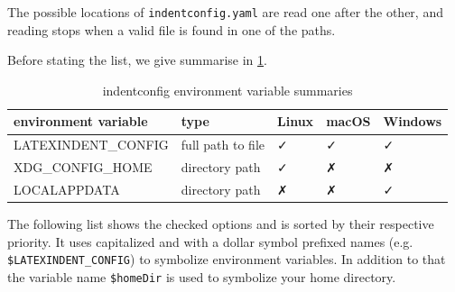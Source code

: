   The possible locations of \texttt{indentconfig.yaml} are read one after the other, and
  reading stops when a valid file is found in one of the paths.

  Before stating the list, we give summarise in \cref{tab:environment:summary}.
  \begin{table}[!htb]
   \centering
   \caption{indentconfig environment variable summaries}
   \label{tab:environment:summary}
   \begin{tabular}{lllll}
    \toprule
    environment variable & type              & Linux    & macOS    & Windows  \\
    \midrule
    LATEXINDENT\_CONFIG  & full path to file & \faCheck & \faCheck & \faCheck \\
    XDG\_CONFIG\_HOME    & directory path    & \faCheck & \faClose & \faClose \\
    LOCALAPPDATA         & directory path    & \faClose & \faClose & \faCheck \\
    \bottomrule
   \end{tabular}
  \end{table}

  The following list shows the checked options and is sorted by their respective
  priority. It uses capitalized and with a dollar symbol prefixed names (e.g.
  \texttt{\$LATEXINDENT\_CONFIG}) to symbolize environment variables. In addition to that
  the variable name \texttt{\$homeDir} is used to symbolize your home directory.

